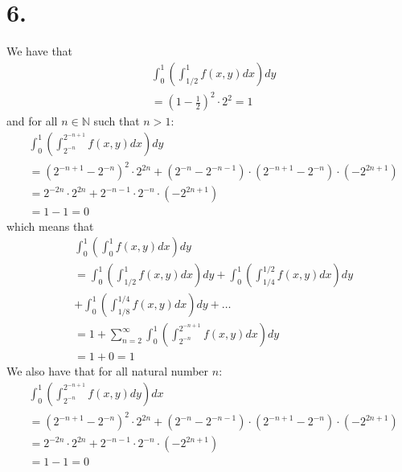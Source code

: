 \documentclass[11pt]{article}
\begin{document}
\section*{6.}
We have that
\begin{equation*}
    \begin{aligned}
        &\int_0^1 \left( \int_{1/2}^1 f(x,y) dx \right) dy \\
        &= \left(1-\frac{1}{2}\right)^2 \cdot 2^2 = 1
    \end{aligned}
\end{equation*}
and for all $n \in \mathbb{N}$ such that $n>1$:
\begin{equation*}
    \begin{aligned}
        &\int_0^1 \left( \int_{2^{-n}}^{2^{-n+1}} f(x,y) dx \right) dy \\
        &= (2^{-n+1} - 2^{-n})^2 \cdot 2^{2n} + (2^{-n} - 2^{-n-1}) \cdot (2^{-n+1} - 2^{-n}) \cdot (-2^{2n+1}) \\
        &= 2^{-2n} \cdot 2^{2n} + 2^{-n-1} \cdot 2^{-n} \cdot (-2^{2n+1}) \\
        &= 1 - 1 = 0
    \end{aligned}
\end{equation*}
which means that 
\begin{equation*}
    \begin{align}
        &\int_0^1 \left(\int_0^1 f(x,y) dx \right) dy \\
        &= \int_0^1 \left(\int_{1/2}^1 f(x,y) dx \right) dy + \int_0^1 \left(\int_{1/4}^{1/2} f(x,y) dx \right) dy \\
        &+ \int_0^1 \left(\int_{1/8}^{1/4} f(x,y) dx \right) dy + \ldots \\
        &= 1 + \sum_{n=2}^\infty \int_0^1 \left(\int_{2^{-n}}^{2^{-n+1}} f(x,y) dx \right) dy \\
        &= 1 + 0 = 1
    \end{align}
\end{equation*}
We also have that for all natural number $n$:
\begin{equation*}
    \begin{aligned}
        &\int_0^1 \left( \int_{2^{-n}}^{2^{-n+1}} f(x,y) dy \right) dx \\
        &= (2^{-n+1} - 2^{-n})^2 \cdot 2^{2n} + (2^{-n} - 2^{-n-1}) \cdot (2^{-n+1} - 2^{-n}) \cdot (-2^{2n+1}) \\
        &= 2^{-2n} \cdot 2^{2n} + 2^{-n-1} \cdot 2^{-n} \cdot (-2^{2n+1}) \\
        &= 1 - 1 = 0
    \end{aligned}
\end{equation*}
\end{document}
